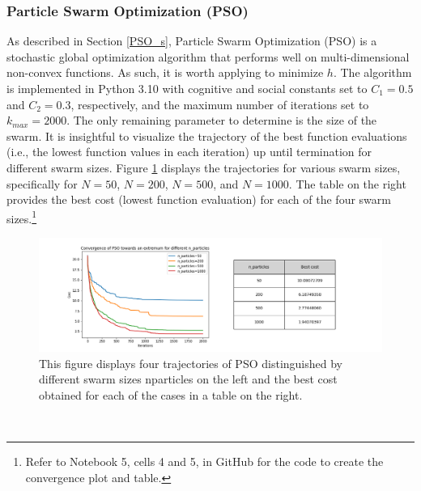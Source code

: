 \subsubsection{Particle Swarm Optimization (PSO)}
As described in Section \ref{PSO_s}, Particle Swarm Optimization (PSO) is a stochastic global optimization algorithm that performs well on multi-dimensional non-convex functions. As such, it is worth applying to minimize $h$. The algorithm is implemented in Python 3.10 \cite{python} with cognitive and social constants set to $C_{1}=0.5$ and $C_{2}=0.3$, respectively, and the maximum number of iterations set to $k_{max}=2000$. The only remaining parameter to determine is the size of the swarm. It is insightful to visualize the trajectory of the best function evaluations (i.e., the lowest function values in each iteration) up until termination for different swarm sizes. Figure \ref{fig:PSOConvMultipleSwarmSizes} displays the trajectories for various swarm sizes, specifically for $N=50$, $N=200$, $N=500$, and $N=1000$. The table on the right provides the best cost (lowest function evaluation) for each of the four swarm sizes.\footnote{Refer to Notebook 5, cells 4 and 5, in GitHub \cite{ThesisCode2023} for the code to create the convergence plot and table.}
\begin{figure}[h!]
    \centering
        \includegraphics[width=1.12\textwidth]{Pictures/PSO_convergence-ackley_multiple_n_particles_with_table.png}
    \caption{This figure displays four trajectories of PSO distinguished by different swarm sizes n\textunderscore particles on the left and the best cost obtained for each of the cases in a table on the right.}\label{fig:PSOConvMultipleSwarmSizes}
\end{figure}\\
